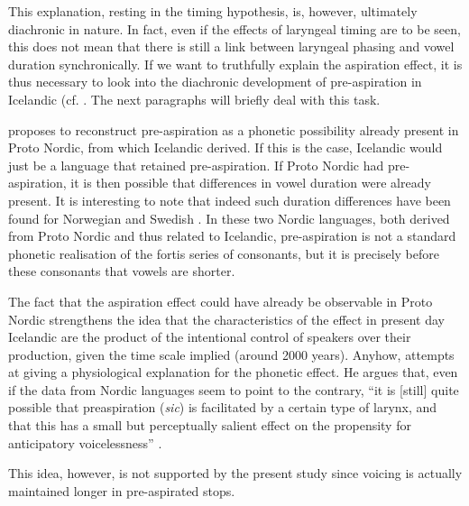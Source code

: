 \documentclass[11pt,a4paper,openany]{memoir}\usepackage[]{graphicx}\usepackage[]{color}
\begin{document}
This explanation, resting in the timing hypothesis, is, however, ultimately diachronic in nature.
In fact, even if the effects of laryngeal timing are to be seen, this does not mean that there is still a link between laryngeal phasing and vowel duration synchronically.
If we want to truthfully explain the aspiration effect, it is thus necessary to look into the diachronic development of pre-aspiration in Icelandic (cf. \citealt{hetzron1972,cristofaro2012,cristofaro2014}.
The next paragraphs will briefly deal with this task.

\citet{helgason2002} proposes to reconstruct pre-aspiration as a phonetic possibility already present in Proto Nordic, from which Icelandic derived.
If this is the case, Icelandic would just be a language that retained pre-aspiration.
If Proto Nordic had pre-aspiration, it is then possible that differences in vowel duration were already present.
It is interesting to note that indeed such duration differences have been found for Norwegian \citep{fintoft1961} and Swedish \citep{elert1970}.
In these two Nordic languages, both derived from Proto Nordic and thus related to Icelandic, pre-aspiration is not a standard phonetic realisation of the fortis series of consonants, but it is precisely before these consonants that vowels are shorter.

The fact that the aspiration effect could have already be observable in Proto Nordic strengthens the idea that the characteristics of the effect in present day Icelandic are the product of the intentional control of speakers over their production, given the time scale implied (around 2000 years).
Anyhow, \citeauthor{helgason2002} attempts at giving a physiological explanation for the phonetic effect.
He argues that, even if the data from Nordic languages seem to point to the contrary, ``it is [still] quite possible that preaspiration (\textit{sic}) is facilitated by a certain type of larynx, and that this has a small but perceptually salient effect on the propensity for anticipatory voicelessness'' \citeyear[231]{helgason2002}.

This idea, however, is not supported by the present study since voicing is actually maintained longer in pre-aspirated stops.

\end{document}
